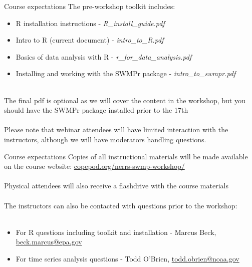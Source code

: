 \documentclass[xcolor=svgnames]{beamer}\usepackage[]{graphicx}\usepackage[]{color}
\begin{document}
\begin{frame}{Course expectations}
The pre-workshop toolkit includes:
\begin{itemize}
\item R installation instructions - \textit{R\_install\_guide.pdf}
\item Intro to R (current document) - \textit{intro\_to\_R.pdf}
\item Basics of data analysis with R - \textit{r\_for\_data\_analysis.pdf}
\item Installing and working with the SWMPr package - \textit{intro\_to\_swmpr.pdf}\\~\\
\end{itemize}
The final pdf is optional as we will cover the content in the workshop, \alert{but you should have the SWMPr package installed prior to the 17th}\\~\\
Please note that webinar attendees will have limited interaction with the instructors, although we will have moderators handling questions.
\end{frame}

\begin{frame}{Course expectations}
Copies of all instructional materials will be made available on the course website: \href{http://copepod.org/nerrs-swmp-workshop/}{copepod.org/nerrs-swmp-workshop/}\\~\\
Physical attendees will also receive a flashdrive with the course materials \\~\\
The instructors can also be contacted with questions prior to the workshop:\\~\\
\begin{itemize}
\item For R questions including toolkit and installation - Marcus Beck, \href{mailto:beck.marcus@epa.gov}{beck.marcus@epa.gov}
\item For time series analysis questions - Todd O'Brien, \href{mailto:todd.obrien@noaa.gov}{todd.obrien@noaa.gov}
\end{itemize}
\end{frame}
\end{document}
